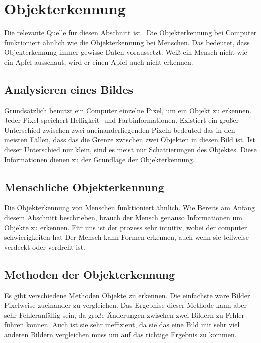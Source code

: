\section{Objekterkennung}
\label{sec:objekterkennung}

Die relevante Quelle für diesen Abschnitt ist~\cite{Lordemann}
Die Objekterkennung bei Computer funktioniert ähnlich wie die Objekterkennung bei Menschen.
Das bedeutet, dass Objekterkennung immer gewisse Daten voraussetzt.
Weiß ein Mensch nicht wie ein Apfel ausschaut, wird er einen Apfel auch nicht erkennen.

\subsection{Analysieren eines Bildes}\label{subsec:analysing-image}

Grundsätzlich benutzt ein Computer einzelne Pixel, um ein Objekt zu erkennen.
Jeder Pixel speichert Helligkeit- und Farbinformationen.
Existiert ein großer Unterschied zwischen zwei aneinanderliegenden Pixeln bedeuted das in den meisten Fällen, dass das die Grenze zwischen zwei Objekten in diesen Bild ist.
Ist dieser Unterschied nur klein, sind es meist nur Schattierungen des Objektes.
Diese Informationen dienen zu der Grundlage der Objekterkennung.

\subsection{Menschliche Objekterkennung}\label{subsec:menschliche-objekterkennung}

Die Objekterkennung von Menschen funktioniert ähnlich.
Wie Bereits am Anfang diesem Abschnitt beschrieben, brauch der Mensch genauso Informationen um Objekte zu erkennen.
Für uns ist der prozess sehr intuitiv, wobei der computer schwierigkeiten hat
Der Mensch kann Formen erkennen, auch wenn sie teilweise verdeckt oder verdreht ist.

\subsection{Methoden der Objekterkennung}\label{subsec:methoden-der-objekterkennung}

Es gibt verschiedene Methoden Objekte zu erkennen.
Die einfachste wäre Bilder Pixelweise zueinander zu vergleichen.
Das Ergebnise dieser Methode kann aber sehr Fehleranfällig sein, da große Änderungen zwischen zwei Bildern zu Fehler führen können.
Auch ist sie sehr ineffizient, da sie das eine Bild mit sehr viel anderen Bildern vergleichen muss um auf das richtige Ergebnis zu kommen.


